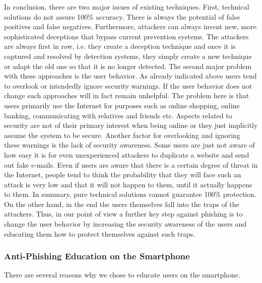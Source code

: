In conclusion, there are two major issues of existing techniques.
 First, technical solutions do not assure 100\% accuracy.
 There is always the potential of false positives and false negatives.
 Furthermore, attackers can always invent new, more sophisticated deceptions that bypass current prevention systems.
 The attackers are always first in row, i.e.
 they create a deception technique and once it is captured and resolved by detection systems, they simply create a new technique or adapt the old one so that it is no longer detected.
 The second major problem with these approaches is the user behavior.
 As already indicated above users tend to overlook or intendedly ignore security warnings.
 If the user behavior does not change such approaches will in fact remain unhelpful.
 The problem here is that users primarily use the Internet for purposes such as online shopping, online banking, communicating with relatives and friends etc.
 Aspects related to security are not of their primary interest when being online or they just implicitly assume the system to be secure.
 Another factor for overlooking and ignoring these warnings is the lack of security awareness.
 Some users are just not aware of how easy it is for even unexperienced attackers to duplicate a website and send out fake e-mails.
 Even if users are aware that there is a certain degree of threat in the Internet, people tend to think the probability that they will face such an attack is very low and that it will not happen to them, until it actually happens to them.
 In summary, pure technical solutions cannot guarantee 100\% protection.
 On the other hand, in the end the users themselves fall into the traps of the attackers.
 Thus, in our point of view a further key step against phishing is to change the user behavior by increasing the security awareness of the users and educating them how to protect themselves against such traps.

\subsubsection{Anti-Phishing Education on the Smartphone}
\label{s:antiphishing_on_smartphone}
There are several reasons why we chose to educate users on the smartphone.


